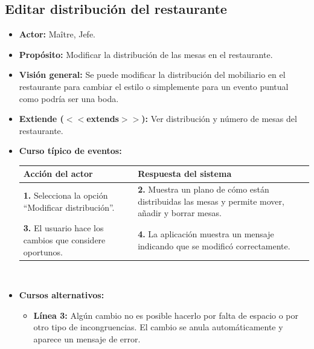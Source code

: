 \documentclass[spanish,a4paper,11pt, twoside]{report}	%
\begin{document}

		\subsection{Editar distribución del restaurante}
			\begin{itemize}
			\item \textbf{Actor:} Maître, Jefe.
			\item \textbf{Propósito:} Modificar la distribución de las mesas en el restaurante.
			\item \textbf{Visión general:} Se puede modificar la distribución del mobiliario
				en el restaurante para cambiar el estilo o simplemente para un evento puntual
				como podría ser una boda.
			\item \textbf{Extiende ($<<$extends$>>$):} Ver distribución y número de mesas del restaurante.
			\item \textbf{Curso típico de eventos:} 	\\
			\begin{tabular}{|p{6cm}||p{6cm}|}
				\hline
				\textbf{Acción del actor} & \textbf{Respuesta del sistema} \\ \hline \hline
				\textbf{1.} Selecciona la opción ``Modificar distribución''. & 
				\textbf{2.} Muestra un plano de cómo están distribuidas las mesas y permite mover, añadir y borrar mesas. \\ \hline
				\textbf{3.} El usuario hace los cambios que considere oportunos.	& 
				\textbf{4.} La aplicación muestra un mensaje indicando que se modificó correctamente. \\ \hline
			\end{tabular}
			\\
			\item \textbf{Cursos alternativos:} 
			\begin{itemize}
				\item  \textbf{Línea 3:} Algún cambio no es posible hacerlo por falta de espacio
					o por otro tipo de incongruencias. El cambio se anula automáticamente y aparece
					un mensaje de error.
			\end {itemize}
		\end {itemize}

\end{document}
